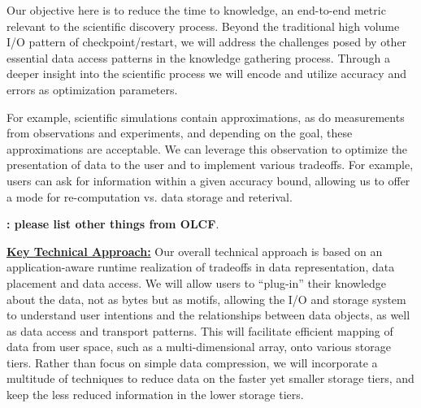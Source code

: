 \documentclass[11pt,letterpaper]{article}
\begin{document}
Our objective here is to reduce the time to knowledge, an end-to-end metric
relevant to the scientific discovery process. Beyond the traditional high
volume I/O pattern of checkpoint/restart, we will address the challenges posed
by other essential data access patterns in the knowledge gathering process.
Through a deeper insight into the scientific process we will encode and utilize
accuracy and errors as optimization parameters. 

For example, scientific simulations contain approximations, as do measurements
from observations and experiments, and depending on the goal, these
approximations are acceptable. We can leverage this observation to optimize the
presentation of data to the user and to implement various tradeoffs. For
example, users can ask for information within a given accuracy bound, allowing
us to offer a mode for re-computation vs. data storage and reterival.

%
{\bf: please list other things from OLCF}.
%


\underline{\textbf{Key Technical Approach:}}
Our overall technical approach is based on an application-aware runtime
realization of tradeoffs in data representation, data placement and data
access. We will allow users to ``plug-in'' their knowledge about the data, not
as bytes but as motifs, allowing the I/O and storage system to understand user
intentions and the relationships between data objects, as well as data access
and transport patterns. This will facilitate efficient mapping of data from
user space, such as a multi-dimensional array, onto various storage tiers.
Rather than focus on simple data compression, we will incorporate a multitude
of techniques to reduce data on the faster yet smaller storage tiers, and keep
the less reduced information in the lower storage tiers.
\end{document}
